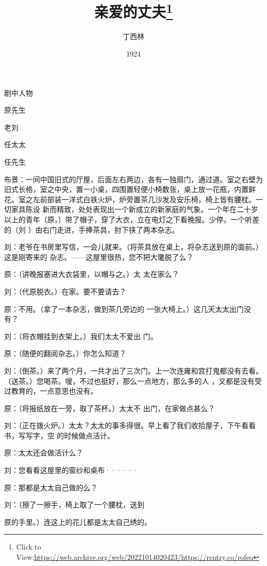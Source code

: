 \documentclass{article}
\title{亲爱的丈夫\footnote{Click to View:\url{https://web.archive.org/web/20221014020423/https://rentry.co/rofeq}}}
\author{丁西林}
\date{1924}
\begin{document}

\maketitle


\Large


﻿剧中人物 


原先生 


老刘 


任太太 


任先生 

布景：一间中国旧式的厅屋，后面左右两边，各有一独扇门，通过道。室之右壁为旧式长格，室之中央，置一小桌，四围置轻便小椅数张，桌上放一花瓶，内置鲜花。室之左前部装一洋式白铁火炉，炉旁置茶几沙发及安乐椅，椅上皆有腰枕。一切家具陈设
\newpage
新而精致，处处表现出一个新成立的新家庭的气象。一个年在二十岁以上的青年（原，）带了帽子，穿了大衣，立在电灯之下看晚报。少停，一个听差的（刘
）由右门走进，手捧茶具，肘下挟了两本杂志。 

刘：老爷在书房里写信，一会儿就来。（将茶具放在桌上，将杂志送到原的面前。）这是刚寄来的
杂志。——这屋里很热，您不把大氅脱了么？ 

原：（讲晚报塞进大衣袋里，以帽与之。）太
太在家么？ 


刘：（代原脱衣。）在家。要不要请去？ 

原：不用。（拿了一本杂志，做到茶几旁边的
一张大椅上。）这几天太太出门没有？ 

刘：（将衣帽挂到衣架上。）我们太太不爱出
门。 


\newpage

原：（随便的翻阅杂志。）你怎么知道？ 

刘：（倒茶。）来了两个月，一共才出了三次门。上一次连雍和宫打鬼都没有去看。（送茶。）您喝茶。嗳，不过也挺好，那么一点地方，那么多的人
，又都是没有受过教育的，一点意思也没有。 

原：（将报纸放在一旁，取了茶杯。）太太不
出门，在家做点甚么？ 

刘：（正在拨火炉。）太太？太太的事多得很。早上看了我们收拾屋子，下午看看书，写写字，空
的时候做点活计。 


原：太太还会做活计么？ 

刘：您看看这屋里的窗纱和桌布······
 


原：那都是太太自己做的么？ 

刘：（擦了一擦手，椅上取了一个腰枕，送到
\newpage

原的手里。）连这上的花儿都是太太自己绣的。 
\end{document}
